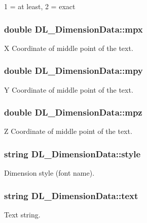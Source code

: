 1 = at least, 2 = exact \hypertarget{structDL__DimensionData_aa6719793c1cd7941fab5b1017548c15a}{
\subsubsection[{mpx}]{\setlength{\rightskip}{0pt plus 5cm}double D\-L\-\_\-\-Dimension\-Data\-::mpx}}\label{structDL__DimensionData_aa6719793c1cd7941fab5b1017548c15a}
X Coordinate of middle point of the text. \hypertarget{structDL__DimensionData_a3c1d57ae67f639a462008fbf001c5ba2}{
\subsubsection[{mpy}]{\setlength{\rightskip}{0pt plus 5cm}double D\-L\-\_\-\-Dimension\-Data\-::mpy}}\label{structDL__DimensionData_a3c1d57ae67f639a462008fbf001c5ba2}
Y Coordinate of middle point of the text. \hypertarget{structDL__DimensionData_a61eafd0c3dff5f902559f6b112647198}{
\subsubsection[{mpz}]{\setlength{\rightskip}{0pt plus 5cm}double D\-L\-\_\-\-Dimension\-Data\-::mpz}}\label{structDL__DimensionData_a61eafd0c3dff5f902559f6b112647198}
Z Coordinate of middle point of the text. \hypertarget{structDL__DimensionData_a436c9dc68556241935bf69229b400b38}{
\subsubsection[{style}]{\setlength{\rightskip}{0pt plus 5cm}string D\-L\-\_\-\-Dimension\-Data\-::style}}\label{structDL__DimensionData_a436c9dc68556241935bf69229b400b38}
Dimension style (font name). \hypertarget{structDL__DimensionData_a2113da4c64efdfa87d05d4a8cab1e13e}{
\subsubsection[{text}]{\setlength{\rightskip}{0pt plus 5cm}string D\-L\-\_\-\-Dimension\-Data\-::text}}\label{structDL__DimensionData_a2113da4c64efdfa87d05d4a8cab1e13e}
Text string.

